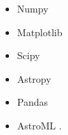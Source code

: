\documentclass[fleqn,usenatbib]{mnras}
\begin{document}
\begin{itemize}
\item Numpy \citep{harris2020array}
\item Matplotlib \citep{Hunter:2007}
\item Scipy \citep{2020SciPy-NMeth}
\item Astropy \citep{astropy-1, astropy-2}
\item Pandas \citep{pandas}
\item AstroML \citep{2012cidu.conf...47V}.
\end{itemize}



\newpage











\bsp	%
\label{lastpage}
\end{document}
